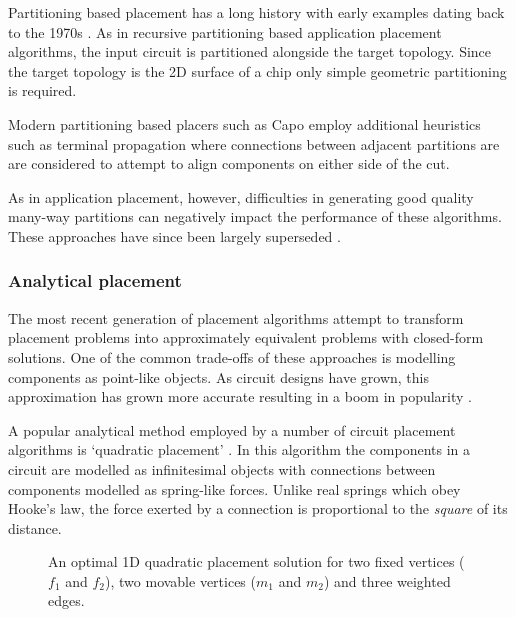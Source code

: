 				Partitioning based placement has a long history with early examples
				dating back to the 1970s \cite{breuer77}. As in recursive partitioning
				based application placement algorithms, the input circuit is
				partitioned alongside the target topology. Since the target topology is
				the 2D surface of a chip only simple geometric partitioning is
				required.
				
				Modern partitioning based placers such as Capo \cite{roy05} employ
				additional heuristics such as terminal propagation where connections
				between adjacent partitions are are considered to attempt to align
				components on either side of the cut.
				
				As in application placement, however, difficulties in generating good
				quality many-way partitions can negatively impact the performance of
				these algorithms. These approaches have since been largely superseded
				\cite{markov15}.
			
			\subsubsection{Analytical placement}
				
				The most recent generation of placement algorithms attempt to transform
				placement problems into approximately equivalent problems with
				closed-form solutions. One of the common trade-offs of these approaches
				is modelling components as point-like objects. As circuit designs have
				grown, this approximation has grown more accurate resulting in a boom
				in popularity \cite{markov15}.
				
				A popular analytical method employed by a number of circuit placement
				algorithms is `quadratic placement' \cite{kahng11,spindler08}. In this
				algorithm the components in a circuit are modelled as infinitesimal
				objects with connections between components modelled as spring-like
				forces. Unlike real springs which obey Hooke's law, the force exerted
				by a connection is proportional to the \emph{square} of its distance.
				
				\begin{figure}
					\center
					
					\caption{An optimal 1D quadratic placement solution for two fixed
					vertices ($f_1$ and $f_2$), two movable vertices ($m_1$ and $m_2$)
					and three weighted edges.}
					\label{fig:quadratic-placement}
				\end{figure}
				
